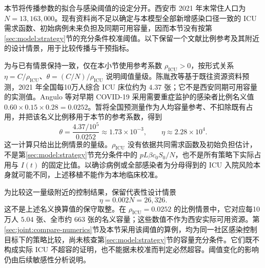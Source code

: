 本节将传播参数的拟合与感染阈值的设定分开。西安市 2021 年末常住人口为 $N=13{,}163{,}000$\cite{XianStat2021}。现有资料尚不足以确定与本模型全部新增感染口径一致的 ICU 需求函数、初始病例未来负担及同期可用容量，因而本节没有按第\ref{sec:model:strategy}节的充分条件校准阈值。以下保留一个文献比例参考及其附近的设计情景，用于比较传播与干预指标。

为与已有情景保持一致，仅在本小节使用参考系数 $\rho_{\mathrm{ICU}}>0$，按形式关系 $\eta=C/\rho_{\mathrm{ICU}}$、$\theta=(C/N)/\rho_{\mathrm{ICU}}$ 说明阈值量级。陈胤孜等\cite{Chen2021ICUForecast}基于既往资源资料预测，2021 年全国每10万人综合 ICU 床位约为 $4.37$ 张；它不是西安同期可用容量的实测值。Angulo 等\cite[补充材料 S4.1]{Angulo2021}对早期 COVID-19 采用需要重症监护的感染者比例名义值 $0.60\times0.15\times0.28=0.0252$。暂将全国预测量作为人均容量参考、不扣除既有占用，并把该名义比例移用于本节的参考系数，得到
\[
\theta=\frac{4.37/10^5}{0.0252}\approx1.73\times10^{-3},
\qquad \eta\approx2.28\times10^4.
\]
这一计算只给出比例情景的量级。$\rho_{\mathrm{ICU}}$ 没有依据共同需求函数及初始负担估计，不是第\ref{sec:model:strategy}节充分条件中的 $pL\beta c_0S_0/N$，也不是所有策略下实际占用与 $I(t)$ 的固定比值。以确诊病例或全部感染者为分母得到的 ICU 入院风险本身就可能不同\cite{Pung2023Undetected}，上述移植不能作为本地临床校准。

为比较这一量级附近的控制结果，保留代表性设计情景
\begin{equation}
\eta=0.002N=26{,}326.
\end{equation}
这不是上述名义换算值的保守取整。在 $\rho_{\mathrm{ICU}}=0.0252$ 的比例情景中，它对应每10万人 $5.04$ 张、全市约 $663$ 张的名义容量；这些数值不作为西安实际可用资源。第\ref{sec:joint:compare-numerics}节及本节采用该阈值的算例，均为同一社区感染控制目标下的策略比较，尚未核查第\ref{sec:model:strategy}节的容量充分条件。它们既不构成实际 ICU 不超容的证明，也不能据未校准而判定必然超容。阈值变化的影响仍由后续敏感性分析说明。
